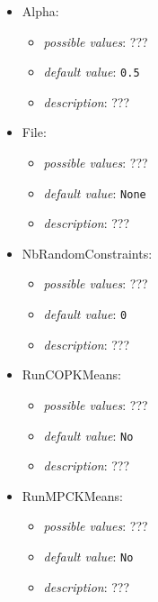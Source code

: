\documentclass{article}
\begin{document}
\begin{itemize}
    \item Alpha:
           \begin{itemize}
                \item \emph{possible values}: ???
                \item \emph{default value}: \texttt{0.5}
                \item \emph{description}: ???
           \end{itemize}
    \item File:
           \begin{itemize}
                \item \emph{possible values}: ???
                \item \emph{default value}: \texttt{None}
                \item \emph{description}: ???
           \end{itemize}
    \item NbRandomConstraints:
           \begin{itemize}
                \item \emph{possible values}: ???
                \item \emph{default value}: \texttt{0}
                \item \emph{description}: ???
           \end{itemize}
    \item RunCOPKMeans:
           \begin{itemize}
                \item \emph{possible values}: ???
                \item \emph{default value}: \texttt{No}
                \item \emph{description}: ???
           \end{itemize}
    \item RunMPCKMeans:
           \begin{itemize}
                \item \emph{possible values}: ???
                \item \emph{default value}: \texttt{No}
                \item \emph{description}: ???
           \end{itemize}
\end{itemize}
\end{document}
